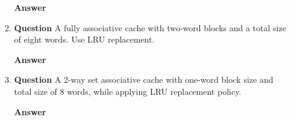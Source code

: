 \documentclass[10pt]{extarticle}
\begin{document}
\begin{enumerate}
\begin{enumerate}
            \textbf{Answer}


            \item \textbf{Question} A fully associative cache with two-word
            blocks and a total size of eight words. Use LRU replacement.

            \textbf{Answer}


            \item \textbf{Question} A 2-way set associative cache with one-word
            block size and total size of 8 words, while applying LRU
            replacement policy.

            \textbf{Answer}

        \end{enumerate}

    \end{enumerate}
\end{document}
